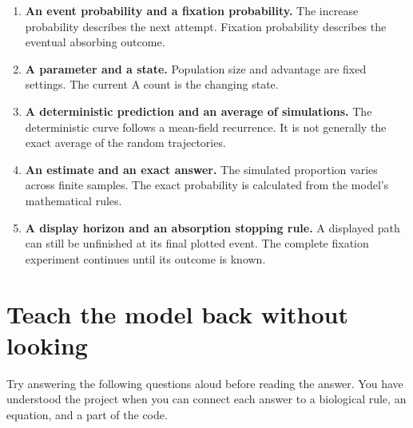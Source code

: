 \begin{enumerate}
 \item \textbf{An event probability and a fixation probability.}
       The increase probability describes the next attempt. Fixation
       probability describes the eventual absorbing outcome.
 \item \textbf{A parameter and a state.} Population size and advantage
       are fixed settings. The current A count is the changing state.
 \item \textbf{A deterministic prediction and an average of simulations.}
       The deterministic curve follows a mean-field recurrence. It is not
       generally the exact average of the random trajectories.
 \item \textbf{An estimate and an exact answer.} The simulated proportion
       varies across finite samples. The exact probability is calculated
       from the model's mathematical rules.
 \item \textbf{A display horizon and an absorption stopping rule.}
       A displayed path can still be unfinished at its final plotted event.
       The complete fixation experiment continues until its outcome is known.
\end{enumerate}

\section{Teach the model back without looking}

Try answering the following questions aloud before reading the answer. You
have understood the project when you can connect each answer to a biological
rule, an equation, and a part of the code.

